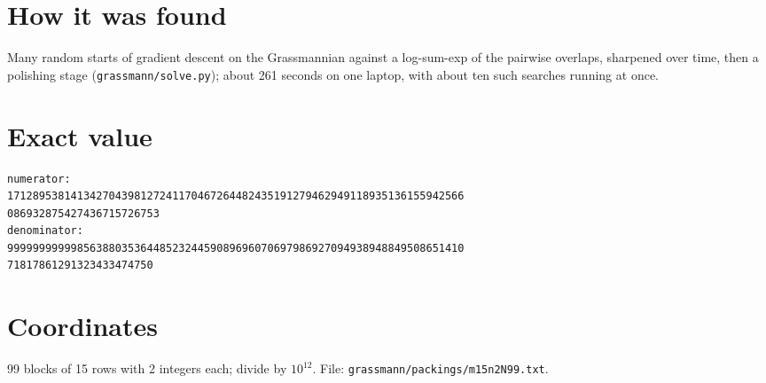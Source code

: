 \documentclass[11pt,a4paper]{article}
\begin{document}
\section{How it was found}
Many random starts of gradient descent on the Grassmannian against a log-sum-exp of the pairwise overlaps, sharpened over time, then a polishing stage (\texttt{grassmann/solve.py}); about 261 seconds on one laptop, with about ten such searches running at once.


\appendix
\section{Exact value}
{\small
\begin{verbatim}
numerator:
171289538141342704398127241170467264482435191279462949118935136155942566
086932875427436715726753
denominator:
999999999998563880353644852324459089696070697986927094938948849508651410
71817861291323433474750
\end{verbatim}}

\section{Coordinates}
99 blocks of 15 rows with 2 integers each; divide by $10^{12}$. File: \texttt{grassmann/packings/m15n2N99.txt}.
{\tiny
\begin{multicols}{4}
\end{multicols}}
\end{document}
